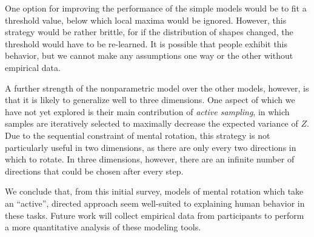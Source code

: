 \documentclass{article} %
\newcommand{\TODO}[1]{\textcolor{red}{[TODO: #1]}}
\begin{document}
One option for improving the performance of the simple models would be
to fit a threshold value, below which local maxima would be
ignored. However, this strategy would be rather brittle, for if the
distribution of shapes changed, the threshold would have to be
re-learned. It is possible that people exhibit this behavior, but we
cannot make any assumptions one way or the other without empirical
data.

A further strength of the nonparametric model over the other models,
however, is that it is likely to generalize well to three
dimensions. One aspect of \cite{Osborne:2012tm} which we have not yet
explored is their main contribution of \textit{active sampling}, in
which samples are iteratively selected to maximally decrease the
expected variance of $Z$. Due to the sequential constraint of mental
rotation, this strategy is not particularly useful in two dimensions,
as there are only every two directions in which to rotate. In three
dimensions, however, there are an infinite number of directions that
could be chosen after every step.

We conclude that, from this initial survey, models of mental rotation
which take an ``active'', directed approach seem well-suited to
explaining human behavior in these tasks. Future work will collect
empirical data from participants to perform a more quantitative
analysis of these modeling tools.



\renewcommand\refname{\normalsize{References}}


\end{document}
